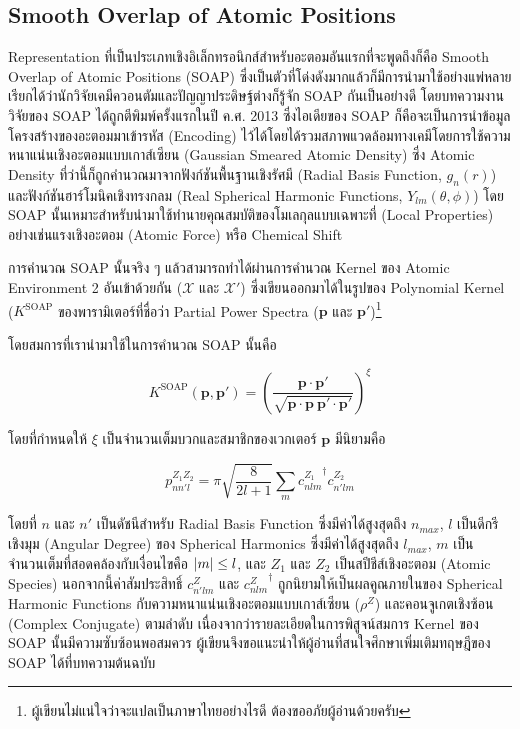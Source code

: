 \subsection{Smooth Overlap of Atomic Positions}
\label{ssec:soap}

Representation ที่เป็นประเภทเชิงอิเล็กทรอนิกส์สำหรับอะตอมอันแรกที่จะพูดถึงก็คือ Smooth Overlap of Atomic Positions (SOAP) 
ซึ่งเป็นตัวที่โด่งดังมากแล้วก็มีการนำมาใช้อย่างแพ่หลาย เรียกได้ว่านักวิจัยเคมีควอนตัมและปัญญาประดิษฐ์ต่างก็รู้จัก SOAP กันเป็นอย่างดี
โดยบทความงานวิจัยของ SOAP ได้ถูกตีพิมพ์ครั้งแรกในปี ค.ศ. 2013 ซึ่งไอเดียของ SOAP ก็คือจะเป็นการนำข้อมูลโครงสร้างของอะตอมมาเข้ารหัส 
(Encoding) ไว้ได้โดยได้รวมสภาพแวดล้อมทางเคมีโดยการใช้ความหนาแน่นเชิงอะตอมแบบเกาส์เซียน (Gaussian Smeared Atomic Density) 
ซึ่ง Atomic Density ที่ว่านี้ก็ถูกคำนวณมาจากฟังก์ชันพื้นฐานเชิงรัศมี (Radial Basis Function, $g_{n}(r)$) และฟังก์ชันฮาร์โมนิคเชิงทรงกลม 
(Real Spherical Harmonic Functions, $Y_{lm}(\theta, \phi)$)\autocite{bartok2013,de2016}
โดย SOAP นั้นเหมาะสำหรับนำมาใช้ทำนายคุณสมบัติของโมเลกุลแบบเฉพาะที่ (Local Properties) อย่างเช่นแรงเชิงอะตอม (Atomic Force) 
หรือ Chemical Shift

การคำนวณ SOAP นั้นจริง ๆ แล้วสามารถทำได้ผ่านการคำนวณ Kernel ของ Atomic Environment 2 อันเข้าด้วยกัน ($\mathcal{X}$ และ 
$\mathcal{X}'$) ซึ่งเขียนออกมาได้ในรูปของ Polynomial Kernel ($K^\mathrm{SOAP}$ ของพารามิเตอร์ที่ชื่อว่า Partial Power 
Spectra ($\mathbf{p}$ และ $\mathbf{p}'$)\footnote{ผู้เขียนไม่แน่ใจว่าจะแปลเป็นภาษาไทยอย่างไรดี ต้องขออภัยผู้อ่านด้วยครับ} 

โดยสมการที่เรานำมาใช้ในการคำนวณ SOAP นั้นคือ

\begin{equation}\label{eq:soap}
    K^\mathrm{SOAP}(\mathbf{p}, \mathbf{p'}) = \left( \frac{\mathbf{p} \cdot \mathbf{p'}}{\sqrt{\mathbf{p} 
    \cdot \mathbf{p}~\mathbf{p'} \cdot \mathbf{p'}}}\right)^{\xi}
\end{equation}

\noindent โดยที่กำหนดให้ $\xi$ เป็นจำนวนเต็มบวกและสมาชิกของเวกเตอร์ $\mathbf{p}$ มีนิยามคือ 

\begin{equation}\label{eq:soap_power_spec}
    p^{Z_1 Z_2}_{n n' l} = \pi \sqrt{\frac{8}{2l+1}}\sum_m {c^{Z_1}_{n l m}}^{\dagger} c^{Z_2}_{n' l m}
\end{equation}

\noindent โดยที่ $n$ และ $n'$ เป็นดัชนีสำหรับ Radial Basis Function ซึ่งมีค่าได้สูงสุดถึง $n_{max}$, $l$ เป็นดีกรีเชิงมุม 
(Angular Degree) ของ Spherical Harmonics ซึ่งมีค่าได้สูงสุดถึง $l_{max}$, $m$ เป็นจำนวนเต็มที่สอดคล้องกับเงื่อนไขคือ $\abs{m} 
\leq l$, และ $Z_{1}$ และ $Z_{2}$ เป็นสปีชีส์เชิงอะตอม (Atomic Species) นอกจากนี้ค่าสัมประสิทธิ์ $c^{Z}_{n'lm}$ และ 
${c^{Z}_{nlm}}^{\dagger}$ ถูกนิยามให้เป็นผลคูณภายในของ Spherical Harmonic Functions กับความหนาแน่นเชิงอะตอมแบบเกาส์เซียน 
($\rho^Z$) และคอนจูเกตเชิงซ้อน (Complex Conjugate) ตามลำดับ\autocite{de2016} เนื่องจากว่ารายละเอียดในการพิสูจน์สมการ Kernel 
ของ SOAP นั้นมีความซับซ้อนพอสมควร ผู้เขียนจึงขอแนะนำให้ผู้อ่านที่สนใจศึกษาเพิ่มเติมทฤษฎีของ SOAP ได้ที่บทความต้นฉบับ 

